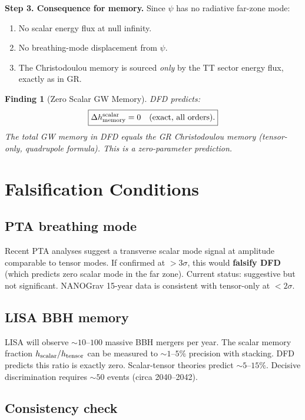 \documentclass[11pt]{article}
\newtheorem{finding}{Finding}
\begin{document}
\textbf{Step 3. Consequence for memory.} Since $\psi$ has no radiative
far-zone mode:
\begin{enumerate}[nosep]
\item No scalar energy flux at null infinity.
\item No breathing-mode displacement from $\psi$.
\item The Christodoulou memory is sourced \emph{only} by the TT
  sector energy flux, exactly as in GR.
\end{enumerate}

\begin{finding}[Zero Scalar GW Memory]
\label{find:memory}
DFD predicts:
\begin{equation}
\boxed{
\Delta h_{\rm memory}^{\rm scalar} = 0 \quad (\text{exact, all orders}).
}
\end{equation}
The total GW memory in DFD equals the GR Christodoulou memory
(tensor-only, quadrupole formula). This is a zero-parameter prediction.
\end{finding}

\section{Falsification Conditions}

\subsection{PTA breathing mode}

Recent PTA analyses suggest a transverse scalar mode signal at
amplitude comparable to tensor modes. If confirmed at $>3\sigma$,
this would \textbf{falsify DFD} (which predicts zero scalar mode
in the far zone). Current status: suggestive but not significant.
NANOGrav 15-year data is consistent with tensor-only at $< 2\sigma$.

\subsection{LISA BBH memory}

LISA will observe $\sim 10$--$100$ massive BBH mergers per year.
The scalar memory fraction $h_{\rm scalar}/h_{\rm tensor}$ can be
measured to $\sim 1$--$5\%$ precision with stacking. DFD predicts
this ratio is exactly zero. Scalar-tensor theories predict
$\sim 5$--$15\%$. Decisive discrimination requires $\sim 50$ events
(circa 2040--2042).

\subsection{Consistency check}
\end{document}

